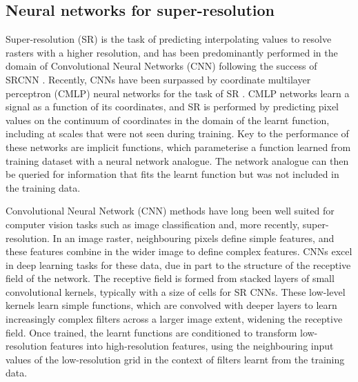 \documentclass[manuscript.tex]{subfiles}
\begin{document}
\subsection{Neural networks for super-resolution}
Super-resolution (SR) is the task of predicting interpolating values to resolve rasters with a higher resolution, and has been predominantly performed in the domain of Convolutional Neural Networks (CNN) following the success of SRCNN \parencite{dongLearningDeepConvolutional2014}.
Recently, CNNs have been surpassed by coordinate multilayer perceptron (CMLP) neural networks for the task of SR \parencite{chenLearningContinuousImage2021}.
CMLP networks learn a signal as a function of its coordinates, and SR is performed by predicting pixel values on the continuum of coordinates in the domain of the learnt function, including at scales that were not seen during training.
Key to the performance of these networks are implicit functions, which parameterise a function learned from training dataset with a neural network analogue.
The network analogue can then be queried for information that fits the learnt function but was not included in the training data.

Convolutional Neural Network (CNN) methods have long been well suited for computer vision tasks such as image classification and, more recently, super-resolution.
In an image raster, neighbouring pixels define simple features, and these features combine in the wider image to define complex features.
CNNs excel in deep learning tasks for these data, due in part to the structure of the receptive field of the network.
The receptive field is formed from stacked layers of small convolutional kernels, typically with a size of  cells for SR CNNs.
These low-level kernels learn simple functions, which are convolved with deeper layers to learn increasingly complex filters across a larger image extent, widening the receptive field.
Once trained, the learnt functions are conditioned to transform low-resolution features into high-resolution features, using the neighbouring input values of the low-resolution grid in the context of filters learnt from the training data.
\end{document}
